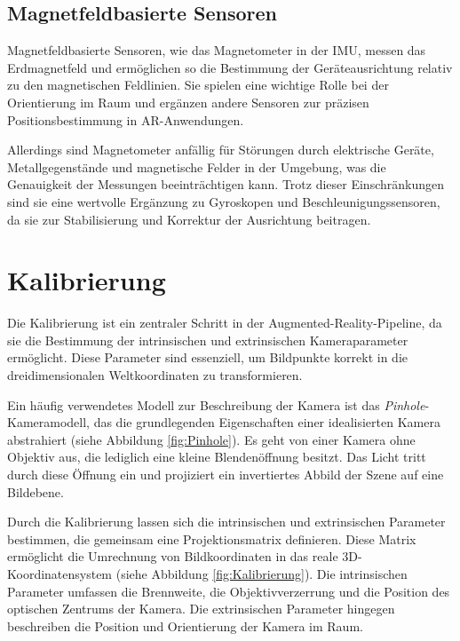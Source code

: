 \subsection{Magnetfeldbasierte Sensoren}

Magnetfeldbasierte Sensoren, wie das Magnetometer in der IMU, messen das Erdmagnetfeld und ermöglichen so die Bestimmung der Geräteausrichtung relativ zu den magnetischen Feldlinien. Sie spielen eine wichtige Rolle bei der Orientierung im Raum und ergänzen andere Sensoren zur präzisen Positionsbestimmung in AR-Anwendungen. \cite{doerner2022virtual}

Allerdings sind Magnetometer anfällig für Störungen durch elektrische Geräte, Metallgegenstände und magnetische Felder in der Umgebung, was die Genauigkeit der Messungen beeinträchtigen kann. Trotz dieser Einschränkungen sind sie eine wertvolle Ergänzung zu Gyroskopen und Beschleunigungssensoren, da sie zur Stabilisierung und Korrektur der Ausrichtung beitragen. \cite{doerner2022virtual}

\section{Kalibrierung}\label{Kalibrierung}

Die Kalibrierung ist ein zentraler Schritt in der Augmented-Reality-Pipeline, da sie die Bestimmung der intrinsischen und extrinsischen Kameraparameter ermöglicht. Diese Parameter sind essenziell, um Bildpunkte korrekt in die dreidimensionalen Weltkoordinaten zu transformieren. \cite{mw2024calibration}

Ein häufig verwendetes Modell zur Beschreibung der Kamera ist das \emph{Pinhole}-Kameramodell, das die grundlegenden Eigenschaften einer idealisierten Kamera abstrahiert (siehe Abbildung \ref{fig:Pinhole}). Es geht von einer Kamera ohne Objektiv aus, die lediglich eine kleine Blendenöffnung besitzt. Das Licht tritt durch diese Öffnung ein und projiziert ein invertiertes Abbild der Szene auf eine Bildebene. \cite{mw2024calibration}

Durch die Kalibrierung lassen sich die intrinsischen und extrinsischen Parameter bestimmen, die gemeinsam eine Projektionsmatrix definieren. Diese Matrix ermöglicht die Umrechnung von Bildkoordinaten in das reale 3D-Koordinatensystem (siehe Abbildung \ref{fig:Kalibrierung}). Die intrinsischen Parameter umfassen die Brennweite, die Objektivverzerrung und die Position des optischen Zentrums der Kamera. Die extrinsischen Parameter hingegen beschreiben die Position und Orientierung der Kamera im Raum. \cite{mw2024calibration}


